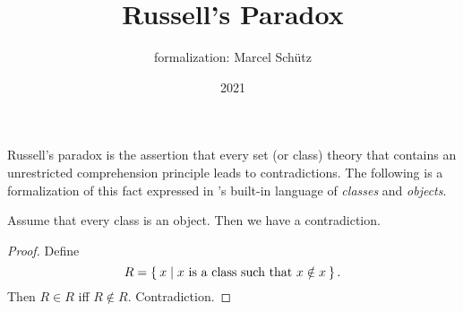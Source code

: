 \documentclass{article}
\title{Russell's Paradox}
\author{\Naproche formalization: Marcel Schütz}
\date{2021}
\begin{document}

  \maketitle

  Russell's paradox is the assertion that every set (or class) theory that
  contains an unrestricted comprehension principle leads to contradictions.
  The following is a formalization of this fact expressed in \Naproche's
  built-in language of \textit{classes} and \textit{objects}.

  \begin{forthel}
    \begin{theorem}[Russell]
      Assume that every class is an object.
      Then we have a contradiction.
    \end{theorem}
    \begin{proof}
      Define \[ R = \Set{x | \text{$x$ is a class such that $x \notin x$}}. \]
      Then $R \in R$ iff $R \notin R$.
      Contradiction.
    \end{proof}
  \end{forthel}
\end{document}
